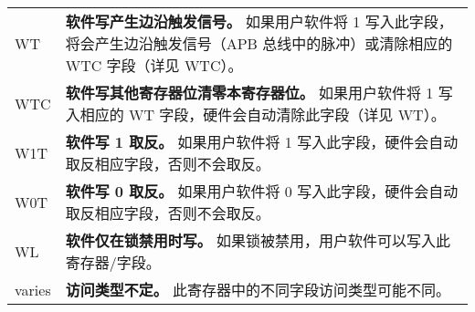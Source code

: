 \begin{longtable}[c]{ R{1cm} p{13cm} }
WT & \textbf{软件写产生边沿触发信号。} 
	如果用户软件将 1 写入此字段，将会产生边沿触发信号（APB 总线中的脉冲）或清除相应的 WTC 字段（详见 WTC）。 \\
WTC & \textbf{软件写其他寄存器位清零本寄存器位。} 
	如果用户软件将 1 写入相应的 WT 字段，硬件会自动清除此字段（详见 WT）。 \\

W1T & \textbf{软件写 1 取反。} 
	如果用户软件将 1 写入此字段，硬件会自动取反相应字段，否则不会取反。 \\
W0T & \textbf{软件写 0 取反。} 
	如果用户软件将 0 写入此字段，硬件会自动取反相应字段，否则不会取反。 \\

WL & \textbf{软件仅在锁禁用时写。} 
	如果锁被禁用，用户软件可以写入此寄存器/字段。 \\

varies & \textbf{访问类型不定。} 
	此寄存器中的不同字段访问类型可能不同。 \\

\end{longtable}
